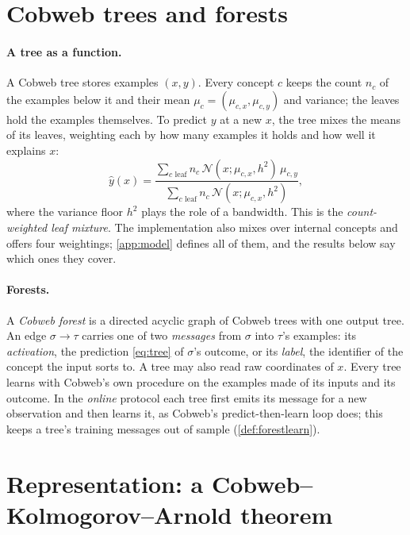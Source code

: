 \documentclass[11pt]{article}
\theoremstyle{definition}
\theoremstyle{remark}
\newcommand{\N}{\mathcal{N}}
\newcommand{\hy}{\hat{y}}
\begin{document}
\section{Cobweb trees and forests}\label{sec:forests}

\paragraph{A tree as a function.}
A Cobweb tree stores examples $(x,y)$.  Every concept $c$ keeps the count $n_c$ of the
examples below it and their mean $\mu_c=(\mu_{c,x},\mu_{c,y})$ and variance; the leaves
hold the examples themselves.  To predict $y$ at a new $x$, the tree mixes the means of
its leaves, weighting each by how many examples it holds and how well it explains $x$:
\begin{equation}\label{eq:tree}
  \hy(x)=\frac{\sum_{c\text{ leaf}}n_c\,\N(x;\mu_{c,x},h^2)\,\mu_{c,y}}
              {\sum_{c\text{ leaf}}n_c\,\N(x;\mu_{c,x},h^2)},
\end{equation}
where the variance floor $h^2$ plays the role of a bandwidth.  This is the
\emph{count-weighted leaf mixture}.  The implementation also mixes over internal concepts and
offers four weightings; \cref{app:model} defines all of them, and the results below say
which ones they cover.

\paragraph{Forests.}
A \emph{Cobweb forest} is a directed acyclic graph of Cobweb trees with one output tree.
An edge $\sigma\to\tau$ carries one of two \emph{messages} from $\sigma$ into $\tau$'s
examples: its \emph{activation}, the prediction \eqref{eq:tree} of $\sigma$'s outcome,
or its \emph{label}, the identifier of the concept the input sorts to.  A tree may also
read raw coordinates of $x$.  Every tree learns with Cobweb's own procedure on the
examples made of its inputs and its outcome.  In the \emph{online} protocol each tree
first emits its message for a new observation and then learns it, as Cobweb's
predict-then-learn loop does; this keeps a tree's training messages out of sample
(\cref{def:forestlearn}).

\section{Representation: a Cobweb--Kolmogorov--Arnold theorem}\label{sec:repr-main}
\end{document}
